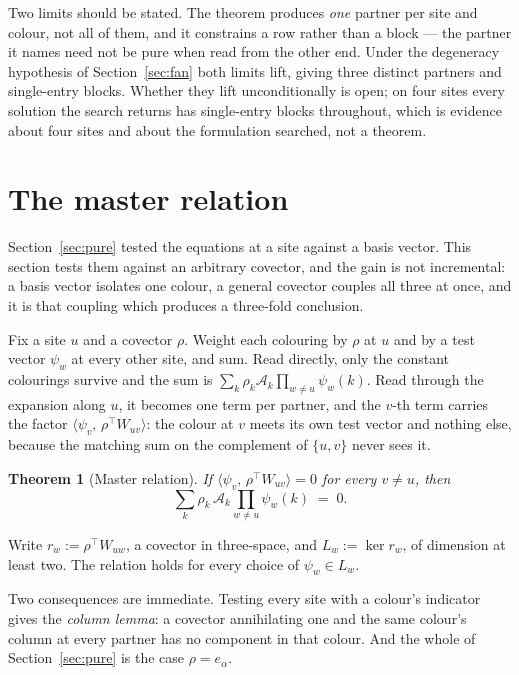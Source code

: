\documentclass[11pt]{article}
\newtheorem{theorem}{Theorem}[section]
\theoremstyle{definition}
\theoremstyle{remark}
\begin{document}
Two limits should be stated. The theorem produces \emph{one} partner per site and
colour, not all of them, and it constrains a row rather than a block --- the partner it
names need not be pure when read from the other end. Under the degeneracy hypothesis of
Section~\ref{sec:fan} both limits lift, giving three distinct partners and single-entry
blocks. Whether they lift unconditionally is open; on four sites every solution the
search returns has single-entry blocks throughout, which is evidence about four sites and
about the formulation searched, not a theorem.

\section{The master relation}\label{sec:master}

Section~\ref{sec:pure} tested the equations at a site against a basis vector. This
section tests them against an arbitrary covector, and the gain is not incremental: a
basis vector isolates one colour, a general covector couples all three at once, and it
is that coupling which produces a three-fold conclusion.

Fix a site $u$ and a covector $\rho$. Weight each colouring by $\rho$ at $u$ and by a
test vector $\psi_w$ at every other site, and sum. Read directly, only the constant
colourings survive and the sum is $\sum_k \rho_k \mathcal{A}_k \prod_{w \neq u}
\psi_w(k)$. Read through the expansion along $u$, it becomes one term per partner, and
the $v$-th term carries the factor $\langle \psi_v,\, \rho^{\!\top} W_{uv}\rangle$: the
colour at $v$ meets its own test vector and nothing else, because the matching sum on the
complement of $\{u,v\}$ never sees it.

\begin{theorem}[Master relation]\label{thm:master}
If $\langle \psi_v,\, \rho^{\!\top} W_{uv}\rangle = 0$ for every $v \neq u$, then
\[
  \sum_{k} \rho_k\, \mathcal{A}_k \prod_{w \neq u} \psi_w(k) \;=\; 0 .
\]
\end{theorem}

Write $r_w := \rho^{\!\top}W_{uw}$, a covector in three-space, and $L_w := \ker r_w$, of
dimension at least two. The relation holds for every choice of $\psi_w \in L_w$.

Two consequences are immediate. Testing every site with a colour's indicator gives the
\emph{column lemma}: a covector annihilating one and the same colour's column at every
partner has no component in that colour. And the whole of Section~\ref{sec:pure} is the
case $\rho = e_\alpha$.
\end{document}
